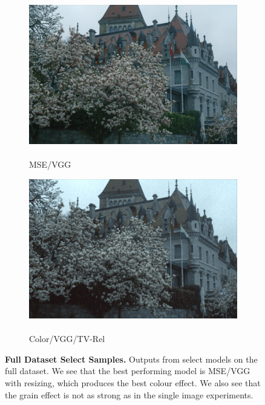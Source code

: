 \begin{figure}
\begin{subfigure}[t]{.24\textwidth}
        \includegraphics[width=\linewidth]{figures/mse-vgg-noise-resize-castle.png}
        \captionsetup{justification=centering}
        \caption{\\MSE/VGG}
      \end{subfigure}
    \hfill
    \begin{subfigure}[t]{.24\textwidth}
      \centering
      \includegraphics[width=\linewidth]{figures/color-vgg-tv-relative-castle.png}
      \captionsetup{justification=centering}
        \caption{\\Color/VGG/TV-Rel}
    \end{subfigure}

    \caption{\textbf{Full Dataset Select Samples.} Outputs from select models on the full dataset. We see that the best performing model is MSE/VGG with resizing, which produces the best colour effect. We also see that the grain effect is not as strong as in the single image experiments.}
    \label{fig:full-data-results}
\end{figure}

